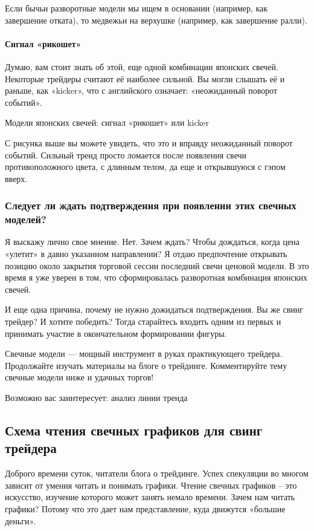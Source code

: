 \documentclass{book}
\begin{document}
Если бычьи разворотные модели мы ищем в основании (например, как
завершение отката), то медвежьи на верхушке (например, как завершение
ралли).

\paragraph{Сигнал «рикошет»}

Думаю, вам стоит знать об этой, еще одной комбинации японских свечей. Некоторые трейдеры считают её наиболее сильной. Вы могли слышать её и раньше, как «kicker», что с английского означает: «неожиданный поворот событий».

Модели японских свечей: сигнал «рикошет» или kicker

С рисунка выше вы можете увидеть, что это и вправду неожиданный
поворот событий. Сильный тренд просто ломается после появления свечи
противоположного цвета, с длинным телом, да еще и открывшуюся с гэпом
вверх.

\subsubsection{Следует ли ждать подтверждения при появлении этих свечных моделей?}

Я выскажу лично свое мнение. Нет. Зачем ждать? Чтобы дождаться, когда цена «улетит» в давно указанном направлении? Я отдаю предпочтение открывать позицию около закрытия торговой сессии последний свечи ценовой модели. В это время я уже уверен в том, что сформировалась разворотная комбинация японских свечей.

И еще одна причина, почему не нужно дожидаться подтверждения. Вы же свинг трейдер? И хотите победить? Тогда старайтесь входить одним из первых и принимать участие в окончательном формировании фигуры.

Свечные модели — мощный инструмент в руках практикующего трейдера. Продолжайте изучать материалы на блоге о трейдинге. Комментируйте тему свечные модели ниже и удачных торгов!

Возможно вас заинтересует: анализ линии тренда

\subsection{Схема чтения свечных графиков для свинг трейдера}

Доброго времени суток, читатели блога о трейдинге. Успех спекуляции во многом зависит от умения читать и понимать графики. Чтение свечных графиков – это искусство, изучение которого может занять немало времени. Зачем нам читать графики? Потому что это дает нам представление, куда движутся «большие деньги».
\end{document}
